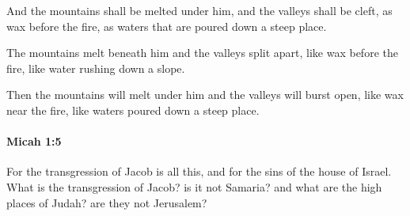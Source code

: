 			\begin{versebox}
					\item[BHS] 
					\item[LXX] 
					\item[ASV] And the mountains shall be melted under him, and the valleys shall be cleft, as wax before the fire, as waters that are poured down a steep place.
					\item[NIV] The mountains melt beneath him and the valleys split apart, like wax before the fire, like water rushing down a slope.
					\item[NRSV] Then the mountains will melt under him and the valleys will burst open, like wax near the fire, like waters poured down a steep place.
			\end{versebox}

		\paragraph{Micah 1:5} %
			\label{MICAH-1-5}

			For the transgression of Jacob is all this, and for the sins of the house of Israel. What is the transgression of Jacob? is it not Samaria? and what are the high places of Judah? are they not Jerusalem?

